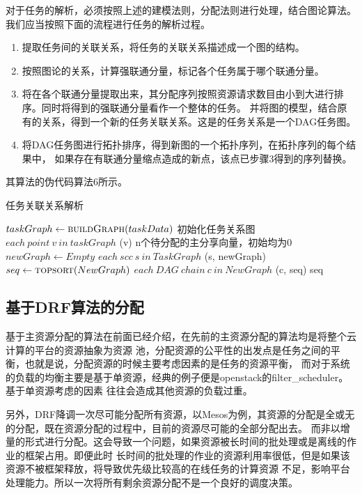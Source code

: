 对于任务的解析，必须按照上述的建模法则，分配法则进行处理，结合图论算法。我们应当按照下面的流程进行任务的解析过程。
\begin{enumerate}
\item 提取任务间的关联关系，将任务的关联关系描述成一个图的结构。
\item 按照图论的关系，计算强联通分量，标记各个任务属于哪个联通分量。
\item 将在各个联通分量提取出来，其分配序列按照资源请求数目由小到大进行排序。同时将得到的强联通分量看作一个整体的任务。
并将图的模型，结合原有的关系，得到一个新的任务关联关系。这是的任务关系是一个DAG任务图。
\item 将DAG任务图进行拓扑排序，得到新图的一个拓扑序列，在拓扑序列的每个结果中，
如果存在有联通分量缩点造成的新点，该点已步骤3得到的序列替换。
\end{enumerate}
其算法的伪代码算法6所示。
\begin{algorithm} 
\caption {任务关联关系解析} 
\begin{codebox}
\li	$taskGraph \leftarrow \textnormal{\scshape buildGraph}(taskData)$ \RComment 初始化任务关系图
\li	\For $each \ point \ v \ in \ taskGraph$    
\li	\Do	
		(v)				\RComment n个待分配的主分享向量，初始均为0
	\End
\li	$newGraph \leftarrow Empty$
\li	\For $each \ scc \ s \ in \ TaskGraph$
\li	\Do
		(s, newGraph)
	\End
\li	$seq \leftarrow \textnormal{\scshape topsort}(NewGraph)$
\li	\For $each \ DAG \ chain \ c \ in \ NewGraph$
\li	\Do	
		(c, seq)
	\End 
\li	\Return seq
\end{codebox}
\end{algorithm} 

\subsection{基于DRF算法的分配}
基于主资源分配的算法在前面已经介绍，在先前的主资源分配的算法均是将整个云计算的平台的资源抽象为资源
池，分配资源的公平性的出发点是任务之间的平衡，也就是说，分配资源的时候主要考虑因素的是任务的资源平衡，
而对于系统的负载的均衡主要是基于单资源，经典的例子便是openstack的filter\_scheduler。基于单资源考虑的因素
往往会造成其他资源的负载过重。

另外，DRF降调一次尽可能分配所有资源，以Mesos为例，其资源的分配是全或无的分配，既在资源分配的过程中，目前的资源尽可能的全部分配出去。
而非以增量的形式进行分配。这会导致一个问题，如果资源被长时间的批处理或是离线的作业的框架占用。即便此时
长时间的批处理的作业的资源利用率很低，但是如果该资源不被框架释放，将导致优先级比较高的在线任务的计算资源
不足，影响平台处理能力。所以一次将所有剩余资源分配不是一个良好的调度决策。

